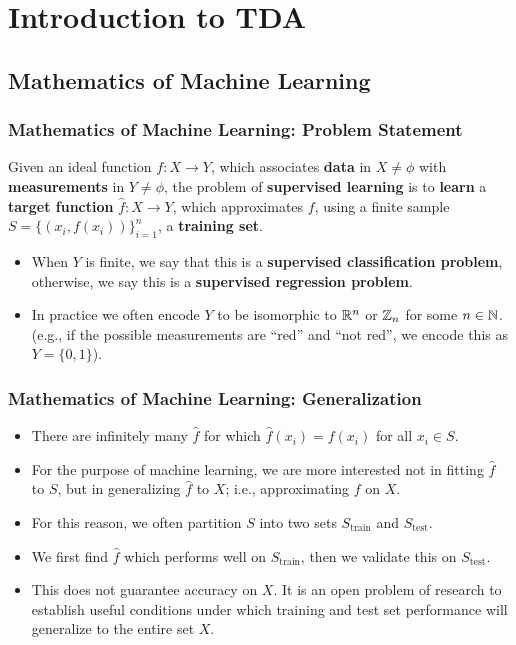 \section{Introduction to TDA}
	\subsection{Mathematics of Machine Learning}
		\begin{frame}
		\frametitle{Mathematics of Machine Learning: Problem Statement}
		
		\begin{definition}
			Given an ideal function $f: X\rightarrow Y$, which associates \textbf{data} in $X\neq\phi$ with \textbf{measurements} in $Y\neq\phi$,
			the problem of \textbf{supervised learning} is to \textbf{learn} a \textbf{target function} $\hat{f}:X\rightarrow Y$, which approximates $f$,
			using a finite sample $S=\{(x_i,f(x_i))\}_{i=1}^n$, a \textbf{training set}.
		\end{definition}

		\begin{itemize}
			\item When $Y$ is finite, we say that this is a \textbf{supervised classification problem},
			otherwise, we say this is a \textbf{supervised regression problem}.
			\medskip
			\item In practice we often encode $Y$ to be isomorphic to $\mathbb{R}^n$ or $\mathbb{Z}_n$ for some $n\in\mathbb{N}$.
			(e.g., if the possible measurements are ``red'' and ``not red'', we encode this as $Y=\{0,1\}$).
		\end{itemize}
		\end{frame}
		
		\begin{frame}
		\frametitle{Mathematics of Machine Learning: Generalization}
		
		\begin{itemize}
			\item There are infinitely many $\hat{f}$ for which $\hat{f}(x_i) = f(x_i)$ for all $x_i\in S$. 
			\medskip
			\item For the purpose of machine learning, we are more interested not in
			fitting $\hat{f}$ to $S$, but in generalizing $\hat{f}$ to $X$; i.e., approximating $f$ on $X$.
			\medskip
			\item For this reason, we often partition $S$ into two sets $S_{\text{train}}$ and $S_{\text{test}}$.
			\medskip
			\item We first find $\hat{f}$ which performs well on $S_{\text{train}}$, then we validate this on $S_{\text{test}}$.
			\medskip
			\item This does not guarantee accuracy on $X$. It is an open problem of research to establish useful conditions under
			which training and test set performance will generalize to the entire set $X$.
		\end{itemize}
		\end{frame}

